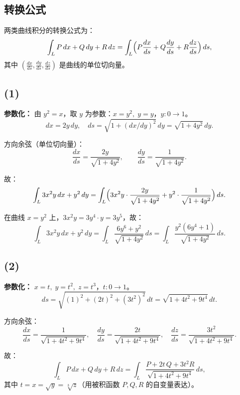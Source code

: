\documentclass[12pt,a4paper]{ctexart}
\begin{document}

\bigskip

\subsection*{转换公式}

两类曲线积分的转换公式为：
\[
\int_L P\,dx+Q\,dy+R\,dz = \int_L \Bigl(P\frac{dx}{ds} + Q\frac{dy}{ds} + R\frac{dz}{ds}\Bigr)\,ds,
\]
其中 $(\frac{dx}{ds},\frac{dy}{ds},\frac{dz}{ds})$ 是曲线的单位切向量。

\subsection*{(1)}

\noindent\textbf{参数化：} 由 $y^2=x$，取 $y$ 为参数：$x=y^2,\;y=y$，$y:0\to1$。
\[
dx = 2y\,dy,\quad ds = \sqrt{1+(dx/dy)^2}\,dy = \sqrt{1+4y^2}\,dy.
\]

方向余弦（单位切向量）：
\[
\frac{dx}{ds} = \frac{2y}{\sqrt{1+4y^2}},\qquad
\frac{dy}{ds} = \frac{1}{\sqrt{1+4y^2}}.
\]

故：
\[
\int_L 3x^2y\,dx + y^2\,dy
   = \int_L \Bigl(3x^2y\cdot\frac{2y}{\sqrt{1+4y^2}}
                 + y^2\cdot\frac{1}{\sqrt{1+4y^2}}\Bigr)\,ds.
\]

在曲线 $x=y^2$ 上，$3x^2y = 3y^4\cdot y = 3y^5$，故：
\[
\boxed{\int_L 3x^2y\,dx + y^2\,dy
      = \int_L \frac{6y^6 + y^2}{\sqrt{1+4y^2}}\,ds
      = \int_L \frac{y^2(6y^4+1)}{\sqrt{1+4y^2}}\,ds.}
\]

\subsection*{(2)}

\noindent\textbf{参数化：} $x=t,\;y=t^2,\;z=t^3$，$t:0\to1$。
\[
ds = \sqrt{(1)^2 + (2t)^2 + (3t^2)^2}\,dt = \sqrt{1+4t^2+9t^4}\,dt.
\]

方向余弦：
\[
\frac{dx}{ds} = \frac{1}{\sqrt{1+4t^2+9t^4}},\quad
\frac{dy}{ds} = \frac{2t}{\sqrt{1+4t^2+9t^4}},\quad
\frac{dz}{ds} = \frac{3t^2}{\sqrt{1+4t^2+9t^4}}.
\]

故：
\[
\boxed{\int_L P\,dx+Q\,dy+R\,dz
      = \int_L \frac{P + 2t\,Q + 3t^2 R}{\sqrt{1+4t^2+9t^4}}\,ds,}
\]
其中 $t = x = \sqrt{y} = \sqrt[3]{z}$（用被积函数 $P,Q,R$ 的自变量表达）。
\end{document}
